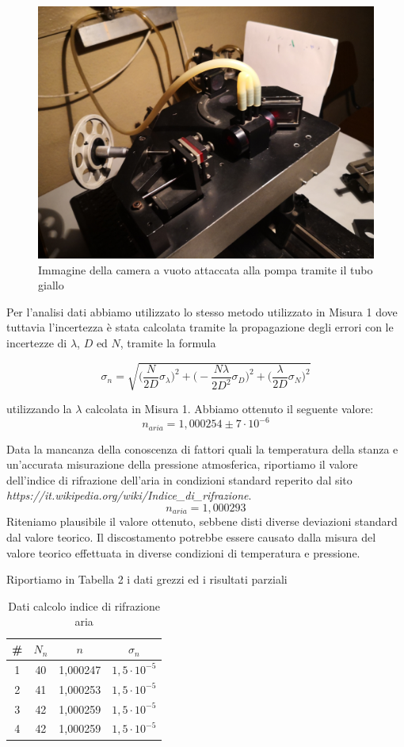 \documentclass{article}
\begin{document}
\begin{figure}[h!]
  \centering
  \includegraphics[width=0.6\linewidth]{IM cameretta}
  \caption{Immagine della camera a vuoto attaccata alla pompa tramite il tubo giallo}
\end{figure}

\pagebreak

Per l'analisi dati abbiamo utilizzato lo stesso metodo utilizzato in Misura 1 dove tuttavia l'incertezza è stata calcolata tramite la propagazione degli errori con le incertezze di $\lambda$, $D$ ed $N$, tramite la formula

\begin{equation}
\sigma_n = \sqrt{ \bigg(\frac{N}{2D} \sigma_\lambda \bigg)^2 + \bigg({-} \frac{N \lambda}{2 D^2} \sigma_D \bigg)^2 + \bigg(\frac{\lambda}{2D} \sigma_N \bigg)^2} 
\end{equation}

utilizzando la $\lambda$ calcolata in Misura 1. Abbiamo ottenuto il seguente valore:
\[ n_{aria} = 1,000254 \pm 7 \cdot 10^{-6} \]

Data la mancanza della conoscenza di fattori quali la temperatura della stanza e un'accurata misurazione della pressione atmosferica, riportiamo il valore dell'indice di rifrazione dell'aria in condizioni standard reperito dal sito \textit{https://it.wikipedia.org/wiki/Indice\_di\_rifrazione}.
\[ n_{aria} = 1,000293  \]
Riteniamo plausibile il valore ottenuto, sebbene disti diverse deviazioni standard dal valore teorico. Il discostamento potrebbe essere causato dalla misura del valore teorico effettuata in diverse condizioni di temperatura e pressione.

Riportiamo in Tabella 2 i dati grezzi ed i risultati parziali


\begin{table}[h!]
\centering
\begin{tabular}{ | c | c | c | c | }
\hline
 \# & $N_n$ & $n$ & $\sigma_n$\\
\hline
   1 & 40 & 1,000247 & $1,5 \cdot 10^{-5}$\\
   2 & 41 & 1,000253 & $1,5 \cdot 10^{-5}$\\
   3 & 42 & 1,000259 & $1,5 \cdot 10^{-5}$\\
   4 & 42 & 1,000259 & $1,5 \cdot 10^{-5}$\\
\hline
\end{tabular}
\caption{Dati calcolo indice di rifrazione aria}
\label{table:2}
\end{table}
\end{document}
